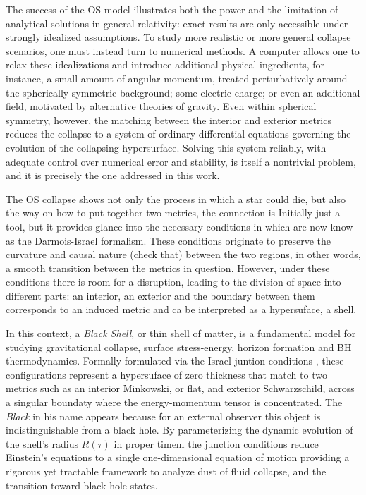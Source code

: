 The success of the OS model illustrates both the power and the limitation of analytical solutions in general relativity: exact results are only accessible under strongly idealized assumptions. To study more realistic or more general collapse scenarios, one must instead turn to numerical methods. A computer allows one to relax these idealizations and introduce additional physical ingredients, for instance, a small amount of angular momentum, treated perturbatively around the spherically symmetric background; some electric charge; or even an additional field, motivated by alternative theories of gravity. Even within spherical symmetry, however, the matching between the interior and exterior metrics reduces the collapse to a system of ordinary differential equations governing the evolution of the collapsing hypersurface. Solving this system reliably, with adequate control over numerical error and stability, is itself a nontrivial problem, and it is precisely the one addressed in this work. %

The OS collapse shows not only the process in which a star could die, but also the way on how to put together two metrics, the connection is Initially just a tool, but it provides glance into the necessary conditions in which are now know as the Darmois-Israel formalism. These conditions originate to preserve the curvature and causal nature (check that) between the two regions, in other words, a smooth transition between the metrics in question. However, under these conditions there is room for a disruption, leading to the division of space into different parts: an interior, an exterior and the boundary between them corresponds to an induced metric and ca be interpreted as a hypersuface, a shell. 

In this context, a \textit{Black Shell}, or thin shell of matter, is a fundamental model for studying gravitational collapse, surface stress-energy, horizon formation and BH thermodynamics. Formally formulated via the Israel juntion conditions \cite{israel1966}, these configurations represent a hypersuface of zero thickness that match to two metrics such as an interior Minkowski, or flat, and exterior Schwarzschild, across a singular boundaty where the energy-momentum tensor is concentrated. The \textit{Black} in his name appears because for an external observer this object is indistinguishable from a black hole. By parameterizing the dynamic evolution of the shell's radius $R(\tau)$ in proper timem the junction conditions reduce Einstein's equations to a single one-dimensional equation of motion providing a rigorous yet tractable framework to analyze dust of fluid collapse, and the transition toward black hole states. 


